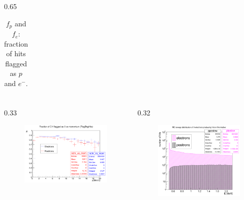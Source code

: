 \documentclass{beamer}
\begin{document}
\begin{frame}
\begin{columns}
\begin{column}{0.65\framewidth}
\begin{table}[h!]
\begin{tabular}{| l | c | c | c |}
    \end{tabular}
    \caption*{{\footnotesize$f_p$ and $f_e$: fraction of hits flagged as $p$ and $e^-$.}}
    \end{table}
    \vspace{-8mm}
    \begin{columns}
        \begin{column}{0.33\framewidth}
    \begin{figure}[!h]
        \centering
        \hspace*{-2.1em}
        \includegraphics[width =1.3\columnwidth]{figures/png/Screenshot_20240818_155835.png}
       \label{fig:0pbarbefore}
\end{figure}
\end{column}
  \begin{column}{0.32\framewidth}
    \begin{figure}[!h]
        \centering
                    \hspace*{-1.1em}
        \includegraphics[width =1.1\columnwidth]{figures/png/Screenshot_20240820_154854.png}

\end{figure}
\end{column}
\end{columns}
\end{column}
\end{columns}
\end{frame}
\end{document}
